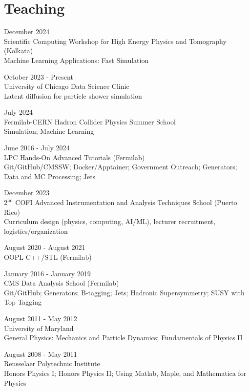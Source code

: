 \section{Teaching}
\begin{description}[leftmargin=12pt,font=\normalfont\textit]
\item[Lecturer] \hfill December 2024\\
Scientific Computing Workshop for High Energy Physics and Tomography (Kolkata)\\
Machine Learning Applications: Fast Simulation
\item[Project Advisor] \hfill October 2023 - Present\\
University of Chicago Data Science Clinic\\
Latent diffusion for particle shower simulation
\item[Lecturer] \hfill July 2024\\
Fermilab-CERN Hadron Collider Physics Summer School\\
Simulation; Machine Learning
\item[Facilitator] \hfill June 2016 - July 2024\\
LPC Hands-On Advanced Tutorials (Fermilab)\\
Git/GitHub/CMSSW; Docker/Apptainer; Government Outreach; Generators; Data and MC Processing; Jets
\item[Co-director] \hfill December 2023\\
$2^{\text{nd}}$ COFI Advanced Instrumentation and Analysis Techniques School (Puerto Rico)\\
Curriculum design (physics, computing, AI/ML), lecturer recruitment, logistics/organization
\item[Teaching Assistant] \hfill August 2020 - August 2021\\
OOPL C++/STL (Fermilab)
\item[Facilitator] \hfill January 2016 - January 2019\\
CMS Data Analysis School (Fermilab)\\
Git/GitHub; Generators; B-tagging; Jets; Hadronic Supersymmetry; SUSY with Top Tagging
\item[Graduate Teaching Assistant] \hfill August 2011 - May 2012\\
University of Maryland\\
General Physics: Mechanics and Particle Dynamics; Fundamentals of Physics II
\item[Undergraduate Teaching Assistant] \hfill August 2008 - May 2011\\
Rensselaer Polytechnic Institute\\
Honors Physics I; Honors Physics II; Using Matlab, Maple, and Mathematica for Physics
\end{description}